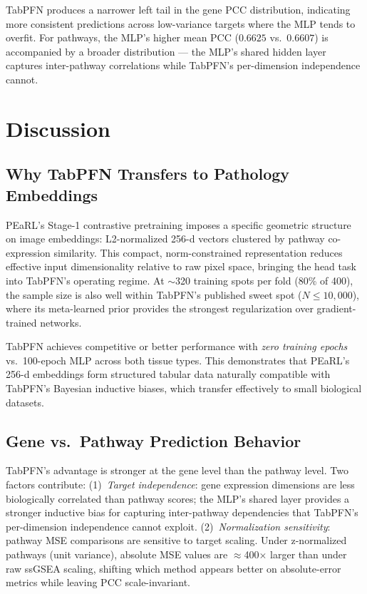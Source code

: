 \documentclass[conference]{IEEEtran}
\begin{document}
TabPFN produces a narrower left tail in the gene PCC distribution, indicating
more consistent predictions across low-variance targets where the MLP tends to
overfit.
For pathways, the MLP's higher mean PCC ($0.6625$ vs.\ $0.6607$) is accompanied
by a broader distribution --- the MLP's shared hidden layer captures inter-pathway
correlations while TabPFN's per-dimension independence cannot.


\section{Discussion}
\label{sec:discussion}

\subsection{Why TabPFN Transfers to Pathology Embeddings}

PEaRL's Stage-1 contrastive pretraining imposes a specific geometric structure
on image embeddings: L2-normalized 256-d vectors clustered by pathway
co-expression similarity.
This compact, norm-constrained representation reduces effective input
dimensionality relative to raw pixel space, bringing the head task into
TabPFN's operating regime.
At $\sim$320 training spots per fold (80\% of 400), the sample size is also
well within TabPFN's published sweet spot ($N \leq 10{,}000$), where its
meta-learned prior provides the strongest regularization over gradient-trained
networks.

TabPFN achieves competitive or better performance with \emph{zero training epochs}
vs.\ 100-epoch MLP across both tissue types.
This demonstrates that PEaRL's 256-d embeddings form structured tabular data
naturally compatible with TabPFN's Bayesian inductive biases, which transfer
effectively to small biological datasets.

\subsection{Gene vs.\ Pathway Prediction Behavior}

TabPFN's advantage is stronger at the gene level than the pathway level.
Two factors contribute:
(1)~\textit{Target independence}: gene expression dimensions are less
biologically correlated than pathway scores; the MLP's shared layer provides a
stronger inductive bias for capturing inter-pathway dependencies that TabPFN's
per-dimension independence cannot exploit.
(2)~\textit{Normalization sensitivity}: pathway MSE comparisons are sensitive
to target scaling. Under z-normalized pathways (unit variance), absolute MSE
values are $\approx$400$\times$ larger than under raw ssGSEA scaling, shifting
which method appears better on absolute-error metrics while leaving PCC
scale-invariant.
\end{document}
